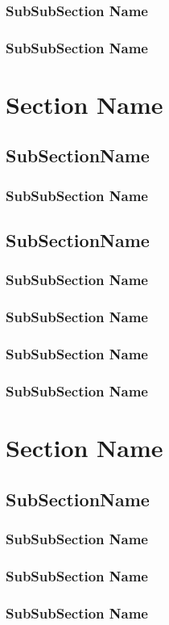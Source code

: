 \subsubsection{SubSubSection Name}
\blindtext
\subsubsection{SubSubSection Name}
\blindtext
\section{Section Name}
\blindtext
\subsection{SubSectionName}
\blindtext
\subsubsection{SubSubSection Name}
\blindtext
\subsection{SubSectionName}
\blindtext
\subsubsection{SubSubSection Name}
\blindtext
\subsubsection{SubSubSection Name}
\blindtext
\subsubsection{SubSubSection Name}
\blindtext
\blindtext
\subsubsection{SubSubSection Name}
\blindtext
\section{Section Name}
\blindtext
\subsection{SubSectionName}
\blindtext
\subsubsection{SubSubSection Name}
\blindtext
\subsubsection{SubSubSection Name}
\blindtext
\subsubsection{SubSubSection Name}
\blindtext
